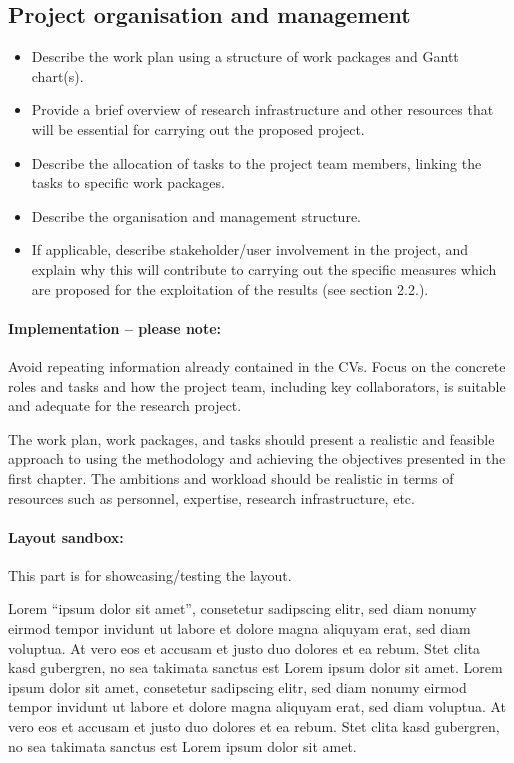 \documentclass[11pt,a4paper,british]{article}
\begin{document}
\subsection{Project organisation and management}
\begin{itemize}
    \item Describe the work plan using a structure of work packages and Gantt
        chart(s).
    \item Provide a brief overview of research infrastructure and other
        resources that will be essential for carrying out the proposed project.
    \item Describe the allocation of tasks to the project team members, linking
        the tasks to specific work packages.
    \item Describe the organisation and management structure.
    \item If applicable, describe stakeholder/user involvement in the project,
        and explain why this will contribute to carrying out the specific
        measures which are proposed for the exploitation of the results (see
        section 2.2.).
\end{itemize}

\paragraph{Implementation -- please note:}
Avoid repeating information already contained in the CVs. Focus on the concrete
roles and tasks and how the project team, including key collaborators, is
suitable and adequate for the research project.

The work plan, work packages, and tasks should present a realistic and feasible
approach to using the methodology and achieving the objectives presented in the
first chapter. The ambitions and workload should be realistic in terms of
resources such as personnel, expertise, research infrastructure, etc.

\newpage
\paragraph{Layout sandbox:} This part is for showcasing/testing the layout.

Lorem \enquote{ipsum dolor sit amet}, consetetur sadipscing elitr, sed diam nonumy eirmod tempor invidunt ut labore et dolore magna aliquyam erat, sed diam voluptua. At vero eos et accusam et justo duo dolores et ea rebum. Stet clita kasd gubergren, no sea takimata sanctus est Lorem ipsum dolor sit amet. Lorem ipsum dolor sit amet, consetetur sadipscing elitr, sed diam nonumy eirmod tempor invidunt ut labore et dolore magna aliquyam erat, sed diam voluptua. At vero eos et accusam et justo duo dolores et ea rebum. Stet clita kasd gubergren, no sea takimata sanctus est Lorem ipsum dolor sit amet.
\end{document}

